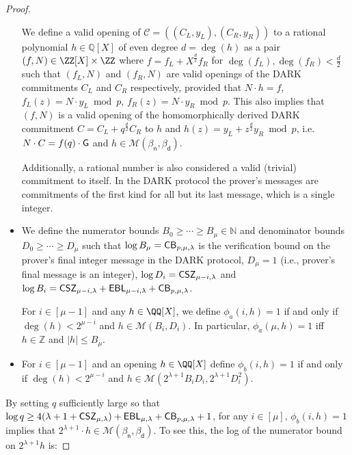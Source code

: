 \begin{proof}
\begin{itemize}
We define a valid opening of $\mathcal{C} = ((C_L, y_L), (C_R, y_R))$ to a rational polynomial $h \in \mathbb{Q}[X]$ of even degree $d = \deg(h)$ as a pair $(f, N) \in \ZZ[X] \times \ZZ$ where $f = f_L + X^{\frac{d}{2}} f_R$ for $\deg(f_L), \deg(f_R) < \frac{d}{2}$ such that $(f_L, N)$ and $(f_R, N)$ are valid openings of the DARK commitments $C_L$ and $C_R$ respectively, provided that $N \cdot h = f$, $f_L(z) = N \cdot y_L \bmod p$, $f_R(z) = N \cdot y_R \bmod p$. This also implies that $(f, N)$ is a valid opening of the homomorphically derived DARK commitment $C = C_L + q^{\frac{d}{2}} C_R$ to $h$ and $h(z) = y_L + z^{\frac{d}{2}} y_R \bmod p$, i.e. $N \cdot C = f(q) \cdot \gr{G}$ and $h \in \mathcal{M}(\beta_\textsf{n}, \beta_\textsf{d})$. %

Additionally, a rational number is also considered a valid (trivial) commitment to itself. In the DARK protocol the prover's messages are commitments of the first kind for all but its last message, which is a single integer. 

\item We define the numerator bounds $B_0\geq \cdots \geq B_\mu \in \mathbb{N}$ and denominator bounds $D_0 \geq \cdots \geq D_\mu$ such that $\log B_\mu = \CorrectnessBound$ is the verification bound on the prover's final integer message in the DARK protocol, $D_\mu = 1$ (i.e., prover's final message is an integer), $\log D_i = \CSZ[\mu - i]$ and $\log B_i = \CSZ[\mu - i] + \EBL[\mu - i] + \CorrectnessBound$. 

For $i \in [\mu-1]$ and any $h \in \QQ[X]$, we define $\phi_a(i, h) = 1 $ if and only if $\deg(h) < 2^{\mu - i}$ and $h \in \mathcal{M}(B_i, D_i)$. In particular, $\phi_a(\mu, h) = 1$ iff $h \in \mathbb{Z}$ and $|h| \leq B_\mu$. 

\item For $i \in [\mu-1]$ and an opening $h \in \QQ[X]$ define $\phi_b(i, h) = 1$ if and only if $\deg(h) < 2^{\mu - i}$ and $h \in \mathcal{M}(2^{\lambda + 1} B_i D_i, 2^{\lambda + 1} D_i^2)$. 

\end{itemize}
By setting $q$ sufficiently large so that $\log q \geq 4(\lambda + 1 + \CSZ[\mu]) + \EBL[\mu] + \CorrectnessBound + 1$, for any $i \in [\mu]$, $\phi_b(i, h) = 1$ implies that $2^{\lambda + 1} \cdot h \in \mathcal{M}(\beta_\textsf{n}, \beta_\textsf{d})$. To see this, the log of the numerator bound on $2^{\lambda + 1} h$ is: 


\end{proof}
